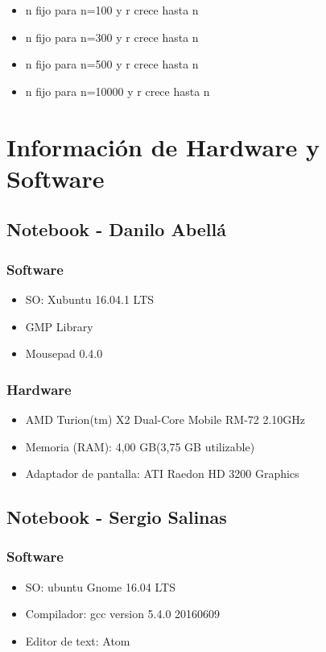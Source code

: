 \documentclass[12pt,letterpaper]{scrartcl}
\begin{document}
\begin{itemize}
\item n fijo para n=100 y r crece hasta n
\item n fijo para n=300 y r crece hasta n
\item n fijo para n=500 y r crece hasta n
\item n fijo para n=10000 y r crece hasta n
\end{itemize}

\newpage
\section{Información de Hardware y Software}


\subsection{ Notebook - Danilo Abellá}
\subsubsection{Software}
\begin{itemize}
\item SO: Xubuntu 16.04.1 LTS
\item GMP Library
\item Mousepad 0.4.0
\end{itemize}

\subsubsection{Hardware}
\begin{itemize}
\item AMD Turion(tm) X2 Dual-Core Mobile RM-72 2.10GHz
\item Memoria (RAM): 4,00 GB(3,75 GB utilizable)
\item Adaptador de pantalla: ATI Raedon HD 3200 Graphics
\end{itemize}




\subsection{Notebook - Sergio Salinas}
\subsubsection{Software}
\begin{itemize}
\item  SO: ubuntu Gnome 16.04 LTS
\item Compilador: gcc version 5.4.0 20160609 
\item Editor de text: Atom
\end{itemize}
\end{document}

